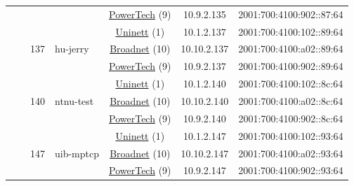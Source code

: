 \begin{small}
\begin{center}
\begin{longtable}{|c|c|c|c|c|c|c|c|}
  &  &  &  & \multicolumn{2}{|c|}{\tiny{\href{http://www.powertech.no}{PowerTech} (9)}} & \tiny{10.9.2.135} & \tiny{2001:700:4100:902::87:64} \\* \cline{3-3}\cline{4-4}\cline{5-5}\cline{6-6}\cline{7-7}\cline{8-8}
  &  & \multirow{3}{*}{\tiny{137}} & \multicolumn{1}{|l|}{\multirow{3}{*}{\tiny{hu-jerry}}} & \multicolumn{2}{|c|}{\tiny{\href{https://www.uninett.no}{Uninett} (1)}} & \tiny{10.1.2.137} & \tiny{2001:700:4100:102::89:64} \\* \cline{5-5}\cline{6-6}\cline{7-7}\cline{8-8}
  &  &  &  & \multicolumn{2}{|c|}{\tiny{\href{https://www.broadnet.no}{Broadnet} (10)}} & \tiny{10.10.2.137} & \tiny{2001:700:4100:a02::89:64} \\* \cline{5-5}\cline{6-6}\cline{7-7}\cline{8-8}
  &  &  &  & \multicolumn{2}{|c|}{\tiny{\href{http://www.powertech.no}{PowerTech} (9)}} & \tiny{10.9.2.137} & \tiny{2001:700:4100:902::89:64} \\* \cline{3-3}\cline{4-4}\cline{5-5}\cline{6-6}\cline{7-7}\cline{8-8}
  &  & \multirow{3}{*}{\tiny{140}} & \multicolumn{1}{|l|}{\multirow{3}{*}{\tiny{ntnu-test}}} & \multicolumn{2}{|c|}{\tiny{\href{https://www.uninett.no}{Uninett} (1)}} & \tiny{10.1.2.140} & \tiny{2001:700:4100:102::8c:64} \\* \cline{5-5}\cline{6-6}\cline{7-7}\cline{8-8}
  &  &  &  & \multicolumn{2}{|c|}{\tiny{\href{https://www.broadnet.no}{Broadnet} (10)}} & \tiny{10.10.2.140} & \tiny{2001:700:4100:a02::8c:64} \\* \cline{5-5}\cline{6-6}\cline{7-7}\cline{8-8}
  &  &  &  & \multicolumn{2}{|c|}{\tiny{\href{http://www.powertech.no}{PowerTech} (9)}} & \tiny{10.9.2.140} & \tiny{2001:700:4100:902::8c:64} \\* \cline{3-3}\cline{4-4}\cline{5-5}\cline{6-6}\cline{7-7}\cline{8-8}
  &  & \multirow{3}{*}{\tiny{147}} & \multicolumn{1}{|l|}{\multirow{3}{*}{\tiny{uib-mptcp}}} & \multicolumn{2}{|c|}{\tiny{\href{https://www.uninett.no}{Uninett} (1)}} & \tiny{10.1.2.147} & \tiny{2001:700:4100:102::93:64} \\* \cline{5-5}\cline{6-6}\cline{7-7}\cline{8-8}
  &  &  &  & \multicolumn{2}{|c|}{\tiny{\href{https://www.broadnet.no}{Broadnet} (10)}} & \tiny{10.10.2.147} & \tiny{2001:700:4100:a02::93:64} \\* \cline{5-5}\cline{6-6}\cline{7-7}\cline{8-8}
  &  &  &  & \multicolumn{2}{|c|}{\tiny{\href{http://www.powertech.no}{PowerTech} (9)}} & \tiny{10.9.2.147} & \tiny{2001:700:4100:902::93:64} \\* \cline{3-3}\cline{4-4}\cline{5-5}\cline{6-6}\cline{7-7}\cline{8-8}

\end{longtable}
\end{center}
\end{small}
